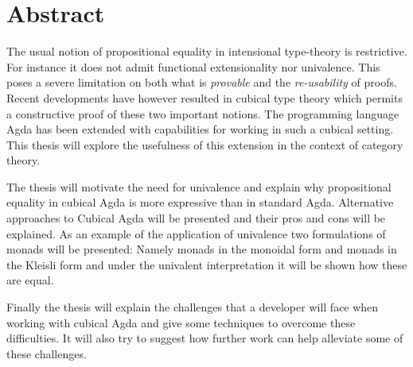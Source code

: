 \chapter*{Abstract}
The usual notion of propositional equality in intensional type-theory
is restrictive.  For instance it does not admit functional
extensionality nor univalence.  This poses a severe limitation on both
what is \emph{provable} and the \emph{re-usability} of proofs.  Recent
developments have however resulted in cubical type theory which
permits a constructive proof of these two important notions.  The
programming language Agda has been extended with capabilities for
working in such a cubical setting.  This thesis will explore the
usefulness of this extension in the context of category theory.

The thesis will motivate the need for univalence and explain why
propositional equality in cubical Agda is more expressive than in
standard Agda.  Alternative approaches to Cubical Agda will be
presented and their pros and cons will be explained.  As an example of
the application of univalence two formulations of monads will be
presented: Namely monads in the monoidal form and monads in the
Kleisli form and under the univalent interpretation it will be shown
how these are equal.

Finally the thesis will explain the challenges that a developer will
face when working with cubical Agda and give some techniques to
overcome these difficulties.  It will also try to suggest how further
work can help alleviate some of these challenges.
